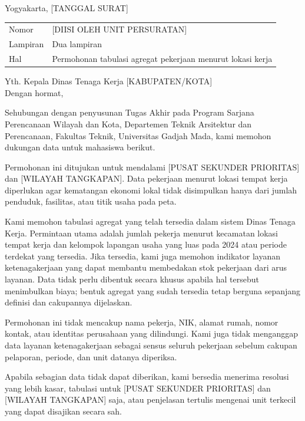 \documentclass[12pt]{article}
\newcommand{\KabupatenKota}{[KABUPATEN/KOTA]}
\newcommand{\AlamatInstansi}{[ALAMAT INSTANSI]}
\newcommand{\PusatSekunder}{[PUSAT SEKUNDER PRIORITAS]}
\newcommand{\WilayahTangkapan}{[WILAYAH TANGKAPAN]}
\newcommand{\PeriodeData}{2024 atau periode terdekat yang tersedia}
\begin{document}
\KopSurat

\begin{flushright}
Yogyakarta, [TANGGAL SURAT]
\end{flushright}

\begin{tabularx}{\textwidth}{@{}P{0.20\textwidth}Y@{}}
  Nomor & [DIISI OLEH UNIT PERSURATAN] \\
  Lampiran & Dua lampiran \\
  Hal & Permohonan tabulasi agregat pekerjaan menurut lokasi kerja
\end{tabularx}

Yth. Kepala Dinas Tenaga Kerja \KabupatenKota\\
\AlamatInstansi

Dengan hormat,

Sehubungan dengan penyusunan Tugas Akhir pada Program Sarjana Perencanaan Wilayah dan Kota, Departemen Teknik Arsitektur dan Perencanaan, Fakultas Teknik, Universitas Gadjah Mada, kami memohon dukungan data untuk mahasiswa berikut.

\IdentitasMahasiswa

Permohonan ini ditujukan untuk mendalami \PusatSekunder{} dan \WilayahTangkapan{}. Data pekerjaan menurut lokasi tempat kerja diperlukan agar kematangan ekonomi lokal tidak disimpulkan hanya dari jumlah penduduk, fasilitas, atau titik usaha pada peta.

Kami memohon tabulasi agregat yang telah tersedia dalam sistem Dinas Tenaga Kerja. Permintaan utama adalah jumlah pekerja menurut kecamatan lokasi tempat kerja dan kelompok lapangan usaha yang luas pada \PeriodeData. Jika tersedia, kami juga memohon indikator layanan ketenagakerjaan yang dapat membantu membedakan stok pekerjaan dari arus layanan. Data tidak perlu dibentuk secara khusus apabila hal tersebut menimbulkan biaya; bentuk agregat yang sudah tersedia tetap berguna sepanjang definisi dan cakupannya dijelaskan.

Permohonan ini tidak mencakup nama pekerja, NIK, alamat rumah, nomor kontak, atau identitas perusahaan yang dilindungi. Kami juga tidak menganggap data layanan ketenagakerjaan sebagai sensus seluruh pekerjaan sebelum cakupan pelaporan, periode, dan unit datanya diperiksa.

\PernyataanPenggunaanData

\PernyataanTanpaBiaya

Apabila sebagian data tidak dapat diberikan, kami bersedia menerima resolusi yang lebih kasar, tabulasi untuk \PusatSekunder{} dan \WilayahTangkapan{} saja, atau penjelasan tertulis mengenai unit terkecil yang dapat disajikan secara sah.
\end{document}
